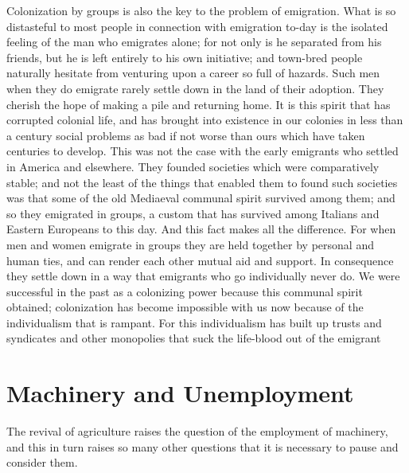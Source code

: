 \documentclass{book}
\begin{document}
Colonization by groups is also the key to the problem of emigration. What is so distasteful to most people in connection with emigration to-day is the isolated feeling of the man who emigrates alone; for not only is he separated from his friends, but he is left entirely to his own initiative; and town-bred people naturally hesitate from venturing upon a career so full of hazards. Such men when they do emigrate rarely settle down in the land of their adoption. They cherish the hope of making a pile and returning home. It is this spirit that has corrupted colonial life, and has brought into existence in our colonies in less than a century social problems as bad if not worse than ours which have taken centuries to develop. This was not the case with the early emigrants who settled in America and elsewhere. They founded societies which were comparatively stable; and not the least of the things that enabled them to found such societies was that some of the old Mediaeval communal spirit survived among them; and so they emigrated in groups, a custom that has survived among Italians and Eastern Europeans to this day. And this fact makes all the difference. For when men and women emigrate in groups they are held together by personal and human ties, and can render each other mutual aid and support. In consequence they settle down in a way that emigrants who go individually never do. We were successful in the past as a colonizing power because this communal spirit obtained; colonization has become impossible with us now because of the individualism that is rampant. For this individualism has built up trusts and syndicates and other monopolies that suck the life-blood out of the emigrant

\chapter{Machinery and Unemployment}
\label{chapter-10}
The revival of agriculture raises the question of the employment of machinery, and this in turn raises so many other questions that it is necessary to pause and consider them.
\end{document}
